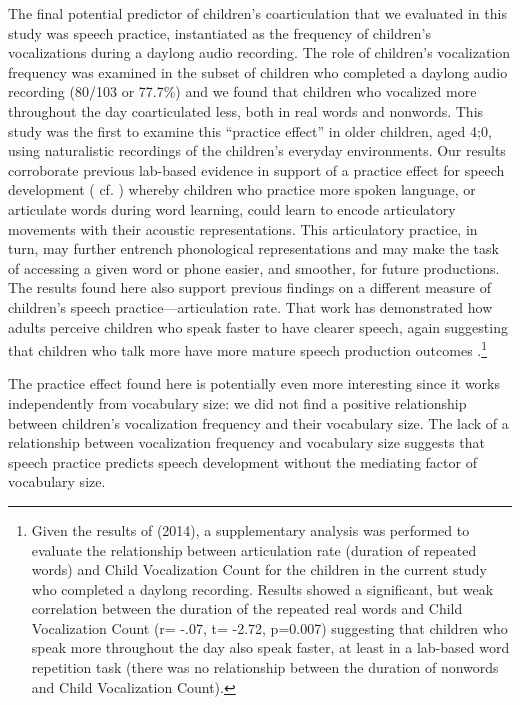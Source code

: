 \documentclass[a4paper,man,natbib,donotrepeattitle, apacite]{apa6}
\begin{document}
The final potential predictor of children’s coarticulation that we evaluated in this study was speech practice, instantiated as the frequency of children’s vocalizations during a daylong audio recording. The role of children's vocalization frequency was examined in the subset of children who completed a daylong audio recording (80/103 or 77.7\%) and we found that children who vocalized more throughout the day coarticulated less, both in real words and nonwords. This study was the first to examine this ``practice effect'' in older children, aged 4;0, using naturalistic recordings of the children’s everyday environments. Our results corroborate previous lab-based evidence in support of a practice effect for speech development ( cf. ) whereby children who practice more spoken language, or articulate words during word learning, could learn to encode articulatory movements with their acoustic representations. This articulatory practice, in turn, may further entrench phonological representations and may make the task of accessing a given word or phone easier, and smoother, for future productions. The results found here also support previous findings on a different measure of children's speech practice---articulation rate. That work has demonstrated how adults perceive children who speak faster to have clearer speech, again suggesting that children who talk more have more mature speech production outcomes \cite{redford2014}.\footnote{Given the results of \citeauthor{redford2014} (2014), a supplementary analysis was performed to evaluate the relationship between articulation rate (duration of repeated words) and Child Vocalization Count for the children in the current study who completed a daylong recording. Results showed a significant, but weak correlation between the duration of the repeated real words and Child Vocalization Count (r= -.07, t= -2.72, p=0.007) suggesting that children who speak more throughout the day also speak faster, at least in a lab-based word repetition task (there was no relationship between the duration of nonwords and Child Vocalization Count).} 

The practice effect found here is potentially even more interesting since it works independently from vocabulary size: we did not find a positive relationship between children's vocalization frequency and their vocabulary size. The lack of a relationship between vocalization frequency and vocabulary size suggests  that speech practice predicts speech development without the mediating factor of vocabulary size. 
\end{document}
